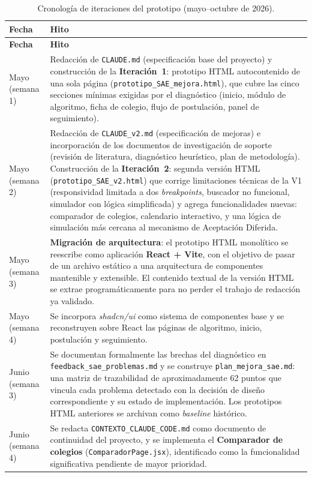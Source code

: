 {\small
\begin{longtable}{p{2.2cm}p{9.5cm}}
\caption{Cronología de iteraciones del prototipo (mayo--octubre de 2026).}\label{tab:iteraciones}\\
\toprule
\textbf{Fecha} & \textbf{Hito} \\
\midrule
\endfirsthead
\toprule
\textbf{Fecha} & \textbf{Hito} \\
\midrule
\endhead
\bottomrule
\endlastfoot
Mayo (semana 1) & Redacción de \texttt{CLAUDE.md} (especificación base del proyecto) y construcción de la \textbf{Iteración~1}: prototipo HTML autocontenido de una sola página (\texttt{prototipo\_SAE\_mejora.html}), que cubre las cinco secciones mínimas exigidas por el diagnóstico (inicio, módulo de algoritmo, ficha de colegio, flujo de postulación, panel de seguimiento). \\
Mayo (semana 2) & Redacción de \texttt{CLAUDE\_v2.md} (especificación de mejoras) e incorporación de los documentos de investigación de soporte (revisión de literatura, diagnóstico heurístico, plan de metodología). Construcción de la \textbf{Iteración~2}: segunda versión HTML (\texttt{prototipo\_SAE\_v2.html}) que corrige limitaciones técnicas de la V1 (responsividad limitada a dos \emph{breakpoints}, buscador no funcional, simulador con lógica simplificada) y agrega funcionalidades nuevas: comparador de colegios, calendario interactivo, y una lógica de simulación más cercana al mecanismo de Aceptación Diferida. \\
Mayo (semana 3) & \textbf{Migración de arquitectura}: el prototipo HTML monolítico se reescribe como aplicación \textbf{React + Vite}, con el objetivo de pasar de un archivo estático a una arquitectura de componentes mantenible y extensible. El contenido textual de la versión HTML se extrae programáticamente para no perder el trabajo de redacción ya validado. \\
Mayo (semana 4) & Se incorpora \emph{shadcn/ui} como sistema de componentes base y se reconstruyen sobre React las páginas de algoritmo, inicio, postulación y seguimiento. \\
Junio (semana 3) & Se documentan formalmente las brechas del diagnóstico en \texttt{feedback\_sae\_problemas.md} y se construye \texttt{plan\_mejora\_sae.md}: una matriz de trazabilidad de aproximadamente 62 puntos que vincula cada problema detectado con la decisión de diseño correspondiente y su estado de implementación. Los prototipos HTML anteriores se archivan como \emph{baseline} histórico. \\
Junio (semana 4) & Se redacta \texttt{CONTEXTO\_CLAUDE\_CODE.md} como documento de continuidad del proyecto, y se implementa el \textbf{Comparador de colegios} (\texttt{ComparadorPage.jsx}), identificado como la funcionalidad significativa pendiente de mayor prioridad. \\

\end{longtable}}
